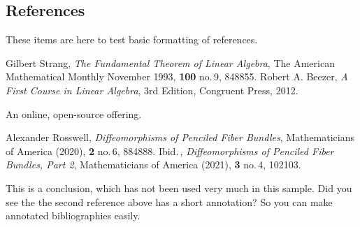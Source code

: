 \documentclass[10pt,]{article}
\theoremstyle{plain}
\theoremstyle{definition}
\theoremstyle{definition}
\theoremstyle{definition}
\theoremstyle{definition}
\theoremstyle{definition}
\theoremstyle{definition}
\numberwithin{equation}{section}
\begin{document}
\subsection[{References}]{References}\label{references-1}
\hypertarget{p-277}{}%
These items are here to test basic formatting of references.%
\begin{referencelist}
\hypertarget{biblio-strang-article}{}Gilbert Strang, \textit{The Fundamental Theorem of Linear Algebra}, The American Mathematical Monthly November 1993, \textbf{100} no.\@\,9, 848\textendash{}855.
\hypertarget{biblio-beezer-fcla}{}Robert A. Beezer, \textit{A First Course in Linear Algebra}, 3rd Edition, Congruent Press, 2012. \par\hypertarget{note-2}{}
\hypertarget{p-278}{}%
An online, open-source offering.%

\hypertarget{biblio-rosswell-fictional}{}Alexander Rosswell, \textit{Diffeomorphisms of Penciled Fiber Bundles}, Mathematicians of America (2020), \textbf{2} no.\@\,6, 884\textendash{}888.
\hypertarget{biblio-rosswell-fictional-two}{}Ibid.\@\,, \textit{Diffeomorphisms of Penciled Fiber Bundles, Part 2}, Mathematicians of America (2021), \textbf{3} no.\@\,4, 102\textendash{}103.
\end{referencelist}
\bigbreak
\hypertarget{p-279}{}%
This is a conclusion, which has not been used very much in this sample.  Did you see the the second reference above has a short annotation?  So you can make annotated bibliographies easily.%
\typeout{************************************************}
\typeout{************************************************}
\end{document}
